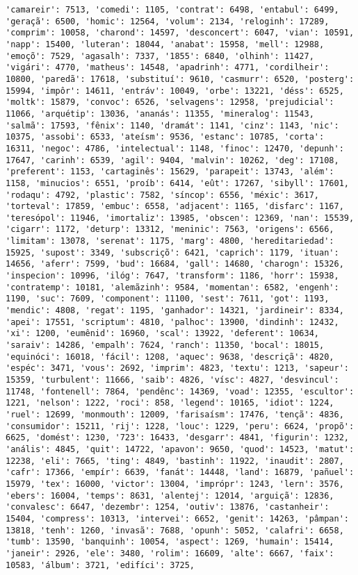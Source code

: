 \documentclass[11pt]{article}
\begin{document}
\begin{Verbatim}[commandchars=\\\{\}]
'camareir': 7513, 'comedi': 1105, 'contrat': 6498, 'entabul': 6499, 'geraçã': 6500, 'homic': 12564, 'volum': 2134, 'reloginh': 17289, 'comprim': 10058, 'charond': 14597, 'desconcert': 6047, 'vian': 10591, 'napp': 15400, 'luteran': 18044, 'anabat': 15958, 'mell': 12988, 'emoçõ': 7529, 'agasalh': 7337, '1855': 6840, 'olhinh': 11427, 'vigári': 4770, 'matheus': 14548, 'apadrinh': 4771, 'cordilheir': 10800, 'paredã': 17618, 'substituí': 9610, 'casmurr': 6520, 'posterg': 15994, 'impôr': 14611, 'entráv': 10049, 'orbe': 13221, 'déss': 6525, 'moltk': 15879, 'convoc': 6526, 'selvagens': 12958, 'prejudicial': 11066, 'arquétip': 13036, 'ananás': 11355, 'mineralog': 11543, 'salmã': 17593, 'fênix': 1140, 'dramát': 1141, 'cinz': 1143, 'nic': 10375, 'assobi': 6533, 'ateísm': 9536, 'estanc': 10785, 'corta': 16311, 'negoc': 4786, 'intelectual': 1148, 'finoc': 12470, 'depunh': 17647, 'carinh': 6539, 'agil': 9404, 'malvin': 10262, 'deg': 17108, 'preferent': 1153, 'cartaginês': 15629, 'parapeit': 13743, 'além': 1158, 'minucios': 6551, 'proíb': 6414, 'eût': 17267, 'sibyll': 17601, 'rodaqu': 4792, 'plastic': 7582, 'síncop': 6556, 'méxic': 3617, 'torteval': 17859, 'embuc': 6558, 'adjacent': 1165, 'disfarc': 1167, 'teresópol': 11946, 'imortaliz': 13985, 'obscen': 12369, 'nan': 15539, 'cigarr': 1172, 'deturp': 13312, 'meninic': 7563, 'origens': 6566, 'limitam': 13078, 'serenat': 1175, 'marg': 4800, 'hereditariedad': 15925, 'supost': 3349, 'subscriçõ': 6421, 'caprich': 1179, 'ituan': 14656, 'aferr': 7599, 'bud': 16684, 'gall': 14680, 'charogn': 15326, 'inspecion': 10996, 'ilóg': 7647, 'transform': 1186, 'horr': 15938, 'contratemp': 10181, 'alemãzinh': 9584, 'momentan': 6582, 'engenh': 1190, 'suc': 7609, 'component': 11100, 'sest': 7611, 'got': 1193, 'mendic': 4808, 'regat': 1195, 'ganhador': 14321, 'jardineir': 8334, 'apei': 17551, 'scriptum': 4810, 'palhoc': 13900, 'dindinh': 12432, 'xi': 1200, 'eumênid': 16960, 'scal': 13922, 'deferent': 10634, 'saraiv': 14286, 'empalh': 7624, 'ranch': 11350, 'bocal': 18015, 'equinóci': 16018, 'fácil': 1208, 'aquec': 9638, 'descriçã': 4820, 'espéc': 3471, 'vous': 2692, 'imprim': 4823, 'textu': 1213, 'sapeur': 15359, 'turbulent': 11666, 'saib': 4826, 'vísc': 4827, 'desvincul': 11748, 'fontenell': 7864, 'pendênc': 14369, 'voad': 12355, 'escultor': 1221, 'nelson': 1222, 'roci': 858, 'legend': 10165, 'idiot': 1224, 'ruel': 12699, 'monmouth': 12009, 'farisaísm': 17476, 'tençã': 4836, 'consumidor': 15211, 'rij': 1228, 'louc': 1229, 'peru': 6624, 'propõ': 6625, 'domést': 1230, '723': 16433, 'desgarr': 4841, 'figurin': 1232, 'anális': 4845, 'quit': 14722, 'apavon': 9650, 'quod': 14523, 'matut': 12238, 'eli': 7665, 'ting': 4849, 'bastinh': 11922, 'inaudit': 2807, 'cafr': 17366, 'empír': 6639, 'fanát': 14448, 'land': 16879, 'pañuel': 15979, 'tex': 16000, 'victor': 13004, 'imprópr': 1243, 'lern': 3576, 'ebers': 16004, 'temps': 8631, 'alentej': 12014, 'arguiçã': 12836, 'convalesc': 6647, 'dezembr': 1254, 'outiv': 13876, 'castanheir': 15404, 'compress': 10313, 'intervei': 6652, 'genit': 14263, 'pâmpan': 13818, 'tenh': 1260, 'invasã': 7688, 'opunh': 5052, 'calafri': 6658, 'tumb': 13590, 'banquinh': 10054, 'aspect': 1269, 'humain': 15414, 'janeir': 2926, 'ele': 3480, 'rolim': 16609, 'alte': 6667, 'faix': 10583, 'álbum': 3721, 'edifíci': 3725, 
\end{Verbatim}
\end{document}
